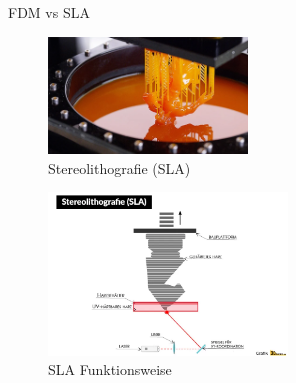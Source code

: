 \begin{frame}{FDM vs SLA}
    \begin{minipage}[b]{.45\textwidth}
    \begin{figure}
        \centering
        \includegraphics[width=150pt]{img_niklas/SLA_Technology-1.png}
        \caption*{Stereolithografie (SLA)}
        \label{fig:my_label}
    \end{figure}
    \end{minipage}
    \hfill
    \begin{minipage}[b]{.45\textwidth}
    \begin{figure}[]
        \centering
        \includegraphics[width=180pt]{img_niklas/sla-stereolithografie-3d-druck.jpg.png}
        \caption*{SLA Funktionsweise}
        \label{fig:my_label}
    \end{figure}
    \end{minipage}
\end{frame}

